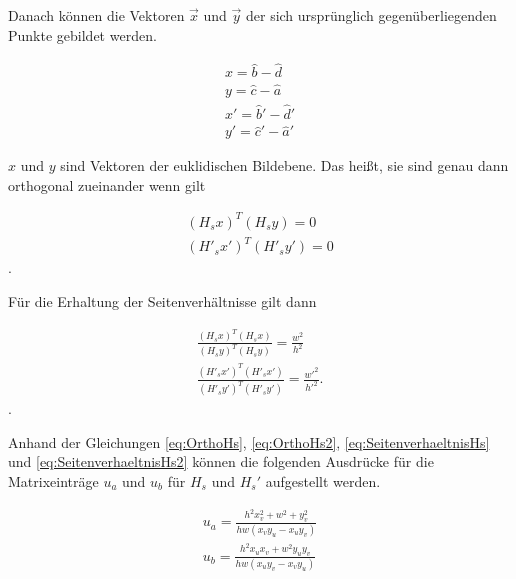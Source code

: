 
Danach können die Vektoren $\vec{x}$ und $\vec{y}$ der sich ursprünglich gegenüberliegenden Punkte gebildet werden.

\begin{gather}
	x = \hat{b}-\hat{d}\\
	y = \hat{c}-\hat{a}\\
	x' = \hat{b}'-\hat{d}'\\
	y' = \hat{c}'-\hat{a}'
\end{gather}

$x$ und $y$ sind Vektoren der euklidischen Bildebene\cite{ZZ}. Das heißt, sie sind genau dann orthogonal zueinander wenn gilt

\begin{gather}
	(H_sx)^T(H_sy)= 0 \label{eq:OrthoHs}\\
	(H'_sx')^T(H'_sy')= 0 \label{eq:OrthoHs2}
\end{gather}.

Für die Erhaltung der Seitenverhältnisse gilt dann

\begin{gather}
	\frac{(H_sx)^T(H_sx)}{(H_sy)^T(H_sy)} = \frac{w^2}{h^2} \label{eq:SeitenverhaeltnisHs}\\
	\frac{(H'_sx')^T(H'_sx')}{(H'_sy')^T(H'_sy')} = \frac{w'^2}{h'^2}\label{eq:SeitenverhaeltnisHs2}	.
\end{gather}.

Anhand der Gleichungen \ref{eq:OrthoHs}, \ref{eq:OrthoHs2}, \ref{eq:SeitenverhaeltnisHs} und \ref{eq:SeitenverhaeltnisHs2} können die folgenden Ausdrücke für die Matrixeinträge $u_a$ und $u_b$ für $H_s$ und $H_s'$ aufgestellt werden\cite{ZZ,ACM}.


\begin{gather}
u_a = \frac{h^2x_v^2+w^2+y_v^2}{hw(x_vy_u-x_uy_v)}\\
u_b = \frac{h^2x_ux_v+w^2y_uy_v}{hw(x_uy_v-x_vy_u)}
\end{gather}



